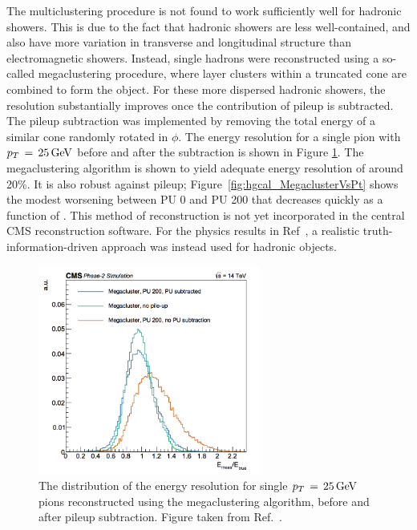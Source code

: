 The multiclustering procedure is not found to work sufficiently well for hadronic showers.
This is due to the fact that hadronic showers are less well-contained, and also have more variation in transverse and longitudinal structure than electromagnetic showers.
Instead, single hadrons were reconstructed using a so-called megaclustering procedure, where layer clusters within a truncated cone are combined to form the object. 
For these more dispersed hadronic showers, the resolution substantially improves once the contribution of pileup is subtracted.
The pileup subtraction was implemented by removing the total energy of a similar cone randomly rotated in $\phi$. 
The energy resolution for a single pion with $p_T\,=\,\SI{25}{GeV}$ before and after the subtraction is shown in Figure \ref{fig:hgcal_SingleMegacluster}. 
The megaclustering algorithm is shown to yield adequate energy resolution of around 20\%. 
It is also robust against pileup; Figure~\ref{fig:hgcal_MegaclusterVsPt} shows the modest worsening between PU 0 and PU 200 that decreases quickly as a function of \pt.
This method of reconstruction is not yet incorporated in the central CMS reconstruction software.
For the physics results in Ref~\cite{HGCAL}, a realistic truth-information-driven approach was instead used for hadronic objects.

\begin{figure}[h!]
  \centering
  \includegraphics[width=0.65\textwidth]{Figures/HGCAL/SingleMegacluster.png}
  \caption[HGCAL pion energy response.]
  {
    The distribution of the energy resolution for single $p_T\,=\,\SI{25}{GeV}$ pions 
    reconstructed using the megaclustering algorithm, 
    before and after pileup subtraction. 
    Figure taken from Ref.~\cite{HGCAL}.
  }
  \label{fig:hgcal_SingleMegacluster}
\end{figure}

